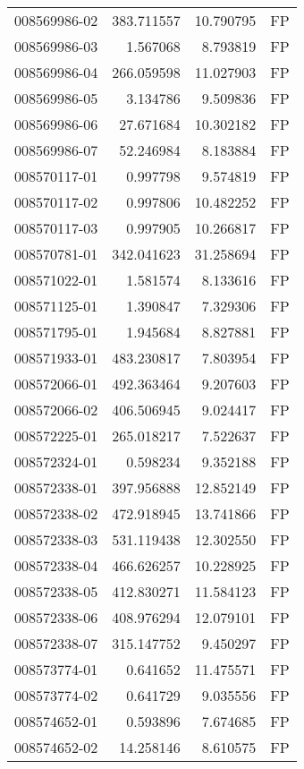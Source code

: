 \begin{tabular}{lrrl}
008569986-02 &  383.711557 &    10.790795 &   FP \\
008569986-03 &    1.567068 &     8.793819 &   FP \\
008569986-04 &  266.059598 &    11.027903 &   FP \\
008569986-05 &    3.134786 &     9.509836 &   FP \\
008569986-06 &   27.671684 &    10.302182 &   FP \\
008569986-07 &   52.246984 &     8.183884 &   FP \\
008570117-01 &    0.997798 &     9.574819 &   FP \\
008570117-02 &    0.997806 &    10.482252 &   FP \\
008570117-03 &    0.997905 &    10.266817 &   FP \\
008570781-01 &  342.041623 &    31.258694 &   FP \\
008571022-01 &    1.581574 &     8.133616 &   FP \\
008571125-01 &    1.390847 &     7.329306 &   FP \\
008571795-01 &    1.945684 &     8.827881 &   FP \\
008571933-01 &  483.230817 &     7.803954 &   FP \\
008572066-01 &  492.363464 &     9.207603 &   FP \\
008572066-02 &  406.506945 &     9.024417 &   FP \\
008572225-01 &  265.018217 &     7.522637 &   FP \\
008572324-01 &    0.598234 &     9.352188 &   FP \\
008572338-01 &  397.956888 &    12.852149 &   FP \\
008572338-02 &  472.918945 &    13.741866 &   FP \\
008572338-03 &  531.119438 &    12.302550 &   FP \\
008572338-04 &  466.626257 &    10.228925 &   FP \\
008572338-05 &  412.830271 &    11.584123 &   FP \\
008572338-06 &  408.976294 &    12.079101 &   FP \\
008572338-07 &  315.147752 &     9.450297 &   FP \\
008573774-01 &    0.641652 &    11.475571 &   FP \\
008573774-02 &    0.641729 &     9.035556 &   FP \\
008574652-01 &    0.593896 &     7.674685 &   FP \\
008574652-02 &   14.258146 &     8.610575 &   FP \\

\end{tabular}
